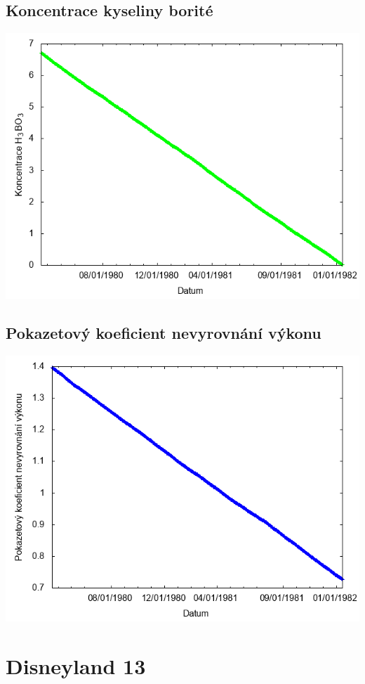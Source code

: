 \documentclass[a4paper,twoside,11pt]{article}
\begin{document}
\subsection*{Koncentrace kyseliny borité}
\begin{center}
\includegraphics[width=.8\textwidth]{graphs/Disneyland_12_bc.png}
\end{center}

\subsection*{Pokazetový koeficient nevyrovnání výkonu}
\begin{center}
\includegraphics[width=.8\textwidth]{graphs/Disneyland_12_fha.png}
\end{center}

\newpage
\section*{Disneyland 13}
\end{document}
